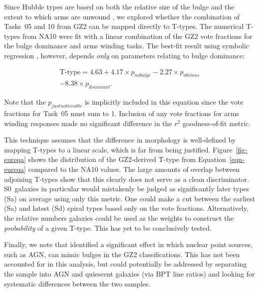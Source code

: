 \documentclass[useAMS,usenatbib]{mn2e}
\begin{document}

Since Hubble types are based on both the relative size of the bulge and the extent to which arms are unwound \citep{hub26}, we explored whether the combination of Tasks~05 and 10 from GZ2 can be mapped directly to T-types. The numerical T-types from NA10 were fit with a linear combination of the GZ2 vote fractions for the bulge dominance and arms winding tasks. The best-fit result using symbolic regression \citep{sch09c}, however, depends {\em only} on parameters relating to bulge dominance:

\begin{eqnarray}
\label{eqn-eureqa}
\text{T-type} = 4.63 + 4.17\times p_{no bulge} - 2.27\times p_{obvious} \\ \nonumber
- 8.38\times p_{dominant}.
\end{eqnarray}

\noindent Note that the $p_{just noticeable}$ is implicitly included in this equation since the vote fractions for Task~05 must sum to 1. Inclusion of any vote fractions for arms winding responses made no significant difference in the $r^2$ goodness-of-fit metric.

This technique assumes that the difference in morphology is well-defined by mapping T-types to a linear scale, which is far from being justified. Figure~\ref{fig-eureqa} shows the distribution of the GZ2-derived T-type from Equation~\ref{eqn-eureqa} compared to the NA10 values. The large amounts of overlap between adjoining T-types show that this clearly does not serve as a clean discriminator. S0~galaxies in particular would mistakenly be judged as significantly later types (Sa) on average using only this metric. One could make a cut between the earliest (Sa) and latest (Sd) spiral types based only on the vote fractions. Alternatively, the relative numbers galaxies could be used as the weights to construct the {\em probability} of a given T-type. This has yet to be conclusively tested. 

Finally, we note that \citet{sim13} identified a significant effect in which nuclear point sources, such as AGN, can mimic bulges in the GZ2 classifications. This has not been accounted for in this analysis, but could potentially be addressed by separating the sample into AGN and quiescent galaxies (via BPT line ratios) and looking for systematic differences between the two samples. 
\end{document}
